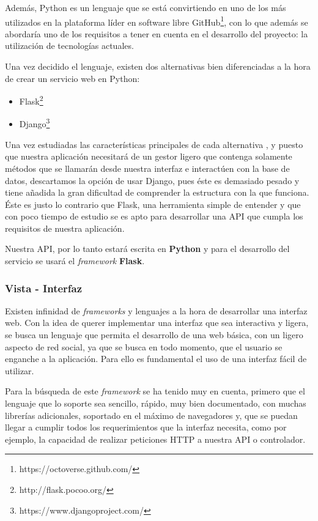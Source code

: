 Además, Python es un lenguaje que se está convirtiendo en uno de los más utilizados en la plataforma líder en software libre GitHub\footnote{https://octoverse.github.com/}, con lo que además se abordaría uno de los requisitos a tener en cuenta en el desarrollo del proyecto: la utilización de tecnologías actuales.

Una vez decidido el lenguaje, existen dos alternativas bien diferenciadas a la hora de crear un servicio web en Python:

\begin{itemize}
    \item Flask\footnote{http://flask.pocoo.org/}
    \item Django\footnote{https://www.djangoproject.com/}
\end{itemize}

Una vez estudiadas las características principales de cada alternativa\cite{flaskvsdjango1} , y puesto que nuestra aplicación necesitará de un gestor ligero que contenga solamente métodos que se llamarán desde nuestra interfaz e interactúen con la base de datos, descartamos la opción de usar Django, pues éste es demasiado pesado y tiene añadida la gran dificultad de comprender la estructura con la que funciona. Éste es justo lo contrario que Flask, una herramienta simple de entender y que con poco tiempo de estudio se es apto para desarrollar una API que cumpla los requisitos de nuestra aplicación. 

Nuestra API, por lo tanto estará escrita en \textbf{Python} y para el desarrollo del servicio se usará el \textit{framework} \textbf{Flask}.

\subsubsection{Vista - Interfaz}
\label{sec::analisis_vistaInterfaz}
Existen infinidad de \textit{frameworks} y lenguajes a la hora de desarrollar una interfaz web. Con la idea de querer implementar una interfaz que sea interactiva y ligera, se busca un lenguaje que permita el desarrollo de una web básica, con un ligero aspecto de red social, ya que se busca en todo momento, que el usuario se enganche a la aplicación. Para ello es fundamental el uso de una interfaz fácil de utilizar.

Para la búsqueda de este \textit{framework} se ha tenido muy en cuenta, primero que el lenguaje que lo soporte sea sencillo, rápido, muy bien documentado, con muchas librerías adicionales, soportado en el máximo de navegadores y, que se puedan llegar a cumplir todos los requerimientos que la interfaz necesita, como por ejemplo, la capacidad de realizar peticiones HTTP a nuestra API o controlador.

